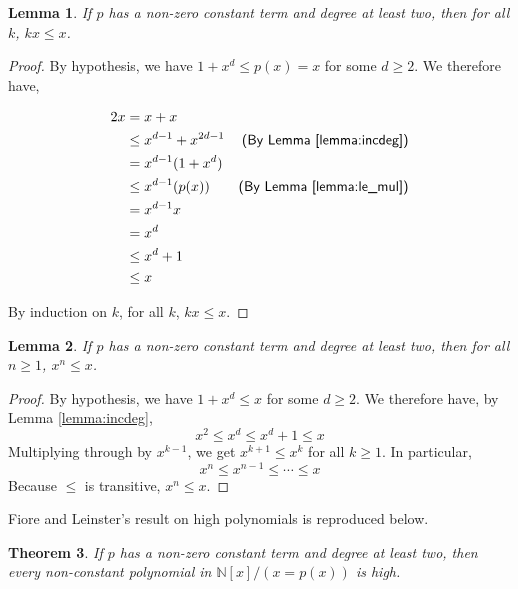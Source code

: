 \documentclass{msthesis}
\newtheorem{theorem}{Theorem}[section]
\newtheorem{lemma}[theorem]{Lemma}
\theoremstyle{definition}
\newcommand{\nat}{\mathbb{N}}
\begin{document}
\begin{lemma}\label{lemma:kxx}
    If $p$ has a non-zero constant term and degree at least two, then for all $k$, $kx \le x$.
\end{lemma}

\begin{proof}
    By hypothesis, we have $1 + x^d \le p(x) = x$ for some $d \ge 2$.  We therefore have,

    \begin{align*}
        2x &= x+x & \\
        &\le x^{d-1} + x^{2d-1} & \textsf{(By Lemma \ref{lemma:incdeg})} \\
        &= x^{d-1}(1+x^d) & \\
        &\le x^{d-1}(p(x)) & \textsf{(By Lemma \ref{lemma:le_mul})} \\
        &= x^{d-1}x & \\
        &= x^d  & \\
        &\le x^d + 1 & \\
        &\le x
    \end{align*}

    By induction on $k$, for all $k$, $kx \le x$.
\end{proof}
\begin{lemma}\label{lemma:xnx}
    If $p$ has a non-zero constant term and degree at least two, then for all $n \ge 1$, $x^n \le x$.
\end{lemma}

\begin{proof}
    By hypothesis, we have $1 + x^d \le x$ for some $d \ge 2$.  We therefore have, by Lemma \ref{lemma:incdeg},
    \[ x^2 \le x^d \le x^d + 1 \le x\]
    Multiplying through by $x^{k-1}$, we get $x^{k+1} \le x^k$ for all $k \ge 1$.  In particular,
    \[x^n \le x^{n-1} \le \cdots \le x\]
    Because $\le$ is transitive, $x^n \le x$.
\end{proof}

Fiore and Leinster's result on high polynomials is reproduced below.

\begin{theorem}\label{theorem:singlevarhighpolynomials}
    If $p$ has a non-zero constant term and degree at least two, then every non-constant polynomial in $\nat[x]/(x=p(x))$ is high.
\end{theorem}
\end{document}
